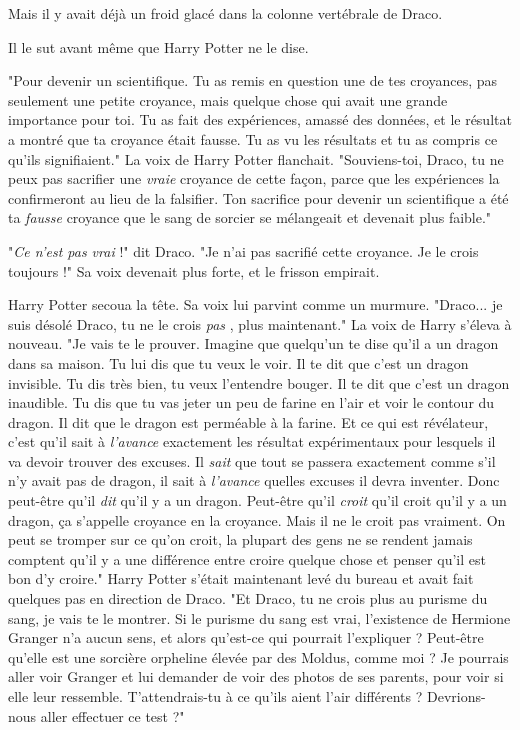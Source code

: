 Mais il y avait déjà un froid glacé dans la colonne vertébrale de Draco.

Il le sut avant même que Harry Potter ne le dise.

"Pour devenir un scientifique. Tu as remis en question une de tes croyances, pas seulement une petite croyance, mais quelque chose qui avait une grande importance pour toi. Tu as fait des expériences, amassé des données, et le résultat a montré que ta croyance était fausse. Tu as vu les résultats et tu as compris ce qu'ils signifiaient." La voix de Harry Potter flanchait. "Souviens-toi, Draco, tu ne peux pas sacrifier une \emph{vraie}  croyance de cette façon, parce que les expériences la confirmeront au lieu de la falsifier. Ton sacrifice pour devenir un scientifique a été ta \emph{fausse}  croyance que le sang de sorcier se mélangeait et devenait plus faible."

"\emph{Ce n'est pas vrai}  !" dit Draco. "Je n'ai pas sacrifié cette croyance. Je le crois toujours !" Sa voix devenait plus forte, et le frisson empirait.

Harry Potter secoua la tête. Sa voix lui parvint comme un murmure. "Draco... je suis désolé Draco, tu ne le crois \emph{pas} , plus maintenant." La voix de Harry s'éleva à nouveau. "Je vais te le prouver. Imagine que quelqu'un te dise qu'il a un dragon dans sa maison. Tu lui dis que tu veux le voir. Il te dit que c'est un dragon invisible. Tu dis très bien, tu veux l'entendre bouger. Il te dit que c'est un dragon inaudible. Tu dis que tu vas jeter un peu de farine en l'air et voir le contour du dragon. Il dit que le dragon est perméable à la farine. Et ce qui est révélateur, c'est qu'il sait à \emph{l'avance}  exactement les résultat expérimentaux pour lesquels il va devoir trouver des excuses. Il \emph{sait}  que tout se passera exactement comme s'il n'y avait pas de dragon, il sait à \emph{l'avance}  quelles excuses il devra inventer. Donc peut-être qu'il \emph{dit}  qu'il y a un dragon. Peut-être qu'il \emph{croit}  qu'il croit qu'il y a un dragon, ça s'appelle croyance en la croyance. Mais il ne le croit pas vraiment. On peut se tromper sur ce qu'on croit, la plupart des gens ne se rendent jamais comptent qu'il y a une différence entre croire quelque chose et penser qu'il est bon d'y croire." Harry Potter s'était maintenant levé du bureau et avait fait quelques pas en direction de Draco. "Et Draco, tu ne crois plus au purisme du sang, je vais te le montrer. Si le purisme du sang est vrai, l'existence de Hermione Granger n'a aucun sens, et alors qu'est-ce qui pourrait l'expliquer ? Peut-être qu'elle est une sorcière orpheline élevée par des Moldus, comme moi ? Je pourrais aller voir Granger et lui demander de voir des photos de ses parents, pour voir si elle leur ressemble. T'attendrais-tu à ce qu'ils aient l'air différents ? Devrions-nous aller effectuer ce test ?"

